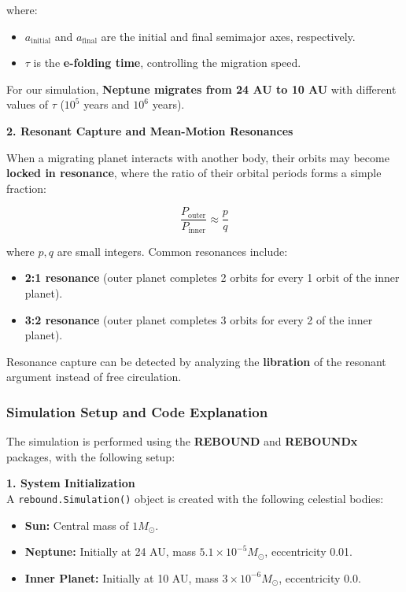 \documentclass[12pt,a4paper]{article}
\begin{document}
where:
\begin{itemize}
    \item \( a_{\text{initial}} \) and \( a_{\text{final}} \) are the initial and final semimajor axes, respectively.
    \item \( \tau \) is the \textbf{e-folding time}, controlling the migration speed.
\end{itemize}

For our simulation, \textbf{Neptune migrates from 24 AU to 10 AU} with different values of \( \tau \) (\( 10^5 \) years and \( 10^6 \) years). 

\textbf{2. Resonant Capture and Mean-Motion Resonances}

When a migrating planet interacts with another body, their orbits may become \textbf{locked in resonance}, where the ratio of their orbital periods forms a simple fraction:

\begin{equation}
    \frac{P_{\text{outer}}}{P_{\text{inner}}} \approx \frac{p}{q}
\end{equation}

where \( p, q \) are small integers. Common resonances include:
\begin{itemize}
    \item \textbf{2:1 resonance} (outer planet completes 2 orbits for every 1 orbit of the inner planet).
    \item \textbf{3:2 resonance} (outer planet completes 3 orbits for every 2 of the inner planet).
\end{itemize}

Resonance capture can be detected by analyzing the \textbf{libration} of the resonant argument instead of free circulation.

\subsubsection{Simulation Setup and Code Explanation}

The simulation is performed using the \textbf{REBOUND} and \textbf{REBOUNDx} packages, with the following setup:

\textbf{1. System Initialization}
\\ A \texttt{rebound.Simulation()} object is created with the following celestial bodies:
\begin{itemize}
    \item \textbf{Sun:} Central mass of \( 1 M_{\odot} \).
    \item \textbf{Neptune:} Initially at 24 AU, mass \( 5.1 \times 10^{-5} M_{\odot} \), eccentricity 0.01.
    \item \textbf{Inner Planet:} Initially at 10 AU, mass \( 3 \times 10^{-6} M_{\odot} \), eccentricity 0.0.
\end{itemize}
\end{document}
